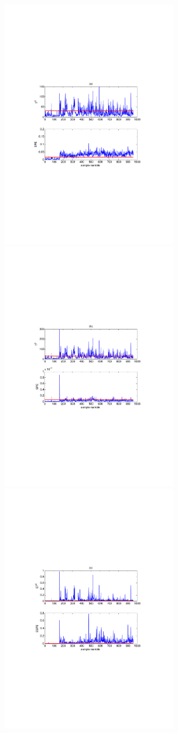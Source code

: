 \begin{figure}[!htb]
  \centering
   \includegraphics[width=3in]{./Pictures/4-1.pdf}
  \includegraphics[width=3in]{./Pictures/4-2.pdf}
  \includegraphics[width=3in]{./Pictures/4-3.pdf}

\end{figure}
